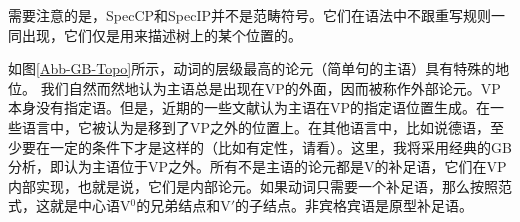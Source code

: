 需要注意的是，SpecCP和SpecIP并不是范畴符号。它们在语法中不跟重写规则一同出现，它们仅是用来描述树上的某个位置的。

如图\ref{Abb-GB-Topo}所示，动词的层级最高的论元（简单句的主语）具有特殊的地位。
我们自然而然地认为主语总是出现在VP的外面，因而被称作外部论元。VP本身没有指定语。但是，近期的一些文献认为主语在VP的指定语位置生成\citep{FS86a-u,KS91a-u}。在一些语言中，它被认为是移到了VP之外的位置上。在其他语言中，比如说德语，至少要在一定的条件下才是这样的（比如有定性，请看\citealp{Diesing92a}）。这里，我将采用经典的GB分析，即认为主语位于VP之外。所有不是主语的论元都是V的补足语，它们在VP内部实现，也就是说，它们是内部论元。如果动词只需要一个补足语，那么按照\xbarc 范式，这就是中心语V$^0$的兄弟结点和V$'$的子结点。非宾格宾语是原型补足语。

